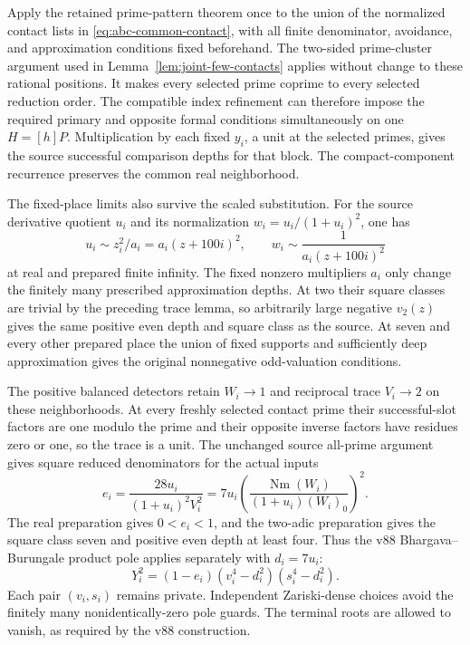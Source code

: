 \documentclass[11pt]{article}
\begin{document}
Apply the retained prime-pattern theorem once to the union of the
normalized contact lists in \eqref{eq:abc-common-contact}, with
all finite denominator, avoidance, and approximation conditions
fixed beforehand.  The two-sided prime-cluster argument used in
Lemma~\ref{lem:joint-few-contacts} applies without change to these
rational positions.  It makes every selected prime coprime to
every selected reduction order.  The compatible index refinement
can therefore impose the required primary and opposite formal
conditions simultaneously on one $H=[h]P$.  Multiplication by
each fixed $y_i$, a unit at the selected primes, gives the source
successful comparison depths for that block.  The compact-component
recurrence preserves the common real neighborhood.

The fixed-place limits also survive the scaled substitution.
For the source derivative quotient $u_i$ and its normalization
$w_i=u_i/(1+u_i)^2$, one has
\[
 u_i\sim z_i^2/a_i=a_i(z+100i)^2,
          \qquad w_i\sim\frac{1}{a_i(z+100i)^2}
\]
at real and prepared finite infinity.  The fixed nonzero multipliers
$a_i$ only change the finitely many prescribed approximation depths.
At two their square classes are trivial by the preceding trace
lemma, so arbitrarily large negative $v_2(z)$ gives the same
positive even depth and square class as the source.  At seven
and every other prepared place the union of fixed supports and
sufficiently deep approximation gives the original nonnegative
odd-valuation conditions.

The positive balanced detectors retain $W_i\to1$ and reciprocal
trace $V_i\to2$ on these neighborhoods.  At every freshly
selected contact prime their successful-slot factors are one
modulo the prime and their opposite inverse factors have residues
zero or one, so the trace is a unit.  The unchanged source
all-prime argument gives square reduced denominators for the
actual inputs
\[
 e_i=\frac{28u_i}{(1+u_i)^2V_i^2}
    =7u_i\left(\frac{\operatorname{Nm}(W_i)}
                       {(1+u_i)(W_i)_0}\right)^2.
\]
The real preparation gives $0<e_i<1$, and the two-adic preparation
gives the square class seven and positive even depth at least four.
Thus the v88 Bhargava--Burungale product pole applies separately
with $d_i=7u_i$:
\[
             Y_i^2=(1-e_i)(v_i^4-d_i^2)(s_i^4-d_i^2).
\]
Each pair $(v_i,s_i)$ remains private.  Independent Zariski-dense
choices avoid the finitely many nonidentically-zero pole guards.
The terminal roots are allowed to vanish, as required by the v88
construction.
\end{document}
